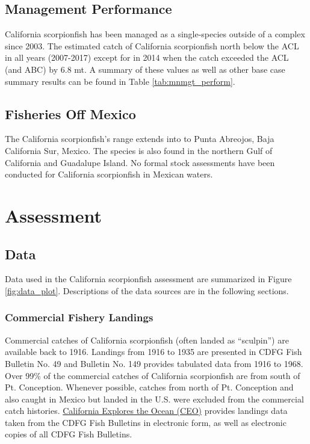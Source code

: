 \documentclass[12pt,]{article}
\begin{document}
\subsection{Management Performance}\label{management-performance-1}

California scorpionfish has been managed as a single-species outside of
a complex since 2003. The estimated catch of California scorpionfish
north below the ACL in all years (2007-2017) except for in 2014 when the
catch exceeded the ACL (and ABC) by 6.8 mt. A summary of these values as
well as other base case summary results can be found in Table
\ref{tab:mnmgt_perform}.

\subsection{Fisheries Off Mexico}\label{fisheries-off-mexico}

The California scorpionfish's range extends into to Punta Abreojos, Baja
California Sur, Mexico. The species is also found in the northern Gulf
of California and Guadalupe Island. No formal stock assessments have
been conducted for California scorpionfish in Mexican waters.

\section{Assessment}\label{assessment}

\subsection{Data}\label{data}

Data used in the California scorpionfish assessment are summarized in
Figure \ref{fig:data_plot}. Descriptions of the data sources are in the
following sections.

\subsubsection{Commercial Fishery
Landings}\label{commercial-fishery-landings}

Commercial catches of California scorpionfish (often landed as
``sculpin'') are available back to 1916. Landings from 1916 to 1935 are
presented in CDFG Fish Bulletin No. 49 and Bulletin No. 149 provides
tabulated data from 1916 to 1968. Over 99\% of the commercial catches of
California scorpionfish are from south of Pt. Conception. Whenever
possible, catches from north of Pt. Conception and also caught in Mexico
but landed in the U.S. were excluded from the commercial catch
histories.
\href{http://library.ucsd.edu/ceo/fishcatchtables/fish-catch-download.html}{California
Explores the Ocean (CEO)} provides landings data taken from the CDFG
Fish Bulletins in electronic form, as well as electronic copies of all
CDFG Fish Bulletins.
\end{document}
